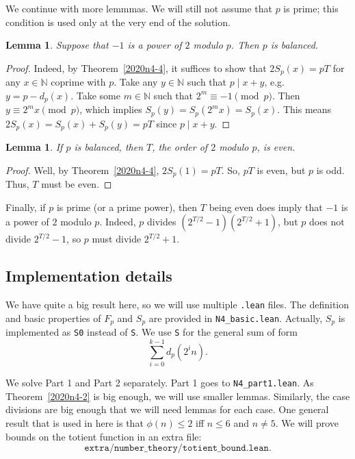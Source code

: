 \documentclass{article}
\newtheorem{lemma}[theorem]{Lemma}
\newcommand{\N}{\mathbb{N}}
\begin{document}
We continue with more lemmmas.
We will still not assume that $p$ is prime; this condition is used only at the very end of the solution.

\begin{lemma}\label{2020n4-5}
Suppose that $-1$ is a power of $2$ modulo $p$.
Then $p$ is balanced.
\end{lemma}
\begin{proof}
Indeed, by Theorem~\ref{2020n4-4}, it suffices to show that $2 S_p(x) = pT$ for any $x \in \N$ coprime with $p$.
Take any $y \in \N$ such that $p \mid x + y$, e.g. $y = p - d_p(x)$.
Take some $m \in \N$ such that $2^m \equiv -1 \pmod{p}$.
Then $y \equiv 2^m x \pmod{p}$, which implies $S_p(y) = S_p(2^m x) = S_p(x)$.
This means $2 S_p(x) = S_p(x) + S_p(y) = pT$ since $p \mid x + y$.
\end{proof}

\begin{lemma}\label{2020n4-6}
If $p$ is balanced, then $T$, the order of $2$ modulo $p$, is even.
\end{lemma}
\begin{proof}
Well, by Theorem~\ref{2020n4-4}, $2 S_p(1) = pT$.
So, $pT$ is even, but $p$ is odd.
Thus, $T$ must be even.
\end{proof}

Finally, if $p$ is prime (or a prime power), then $T$ being even does imply that $-1$ is a power of $2$ modulo $p$.
Indeed, $p$ divides $(2^{T/2} - 1)(2^{T/2} + 1)$, but $p$ does not divide $2^{T/2} - 1$, so $p$ must divide $2^{T/2} + 1$.



\subsection*{Implementation details}

We have quite a big result here, so we will use multiple \texttt{.lean} files.
The definition and basic properties of $F_p$ and $S_p$ are provided in \texttt{N4\_basic.lean}.
Actually, $S_p$ is implemented as \texttt{S0} instead of \texttt{S}.
We use \texttt{S} for the general sum of form
\[ \sum_{i = 0}^{k - 1} d_p(2^i n). \]

We solve Part 1 and Part 2 separately.
Part 1 goes to \texttt{N4\_part1.lean}.
As Theorem~\ref{2020n4-2} is big enough, we will use smaller lemmas.
Similarly, the case divisions are big enough that we will need lemmas for each case.
One general result that is used in here is that $\phi(n) \leq 2$ iff $n \leq 6$ and $n \neq 5$.
We will prove bounds on the totient function in an extra file:
\[ \texttt{extra/number\_theory/totient\_bound.lean}. \]
\end{document}
